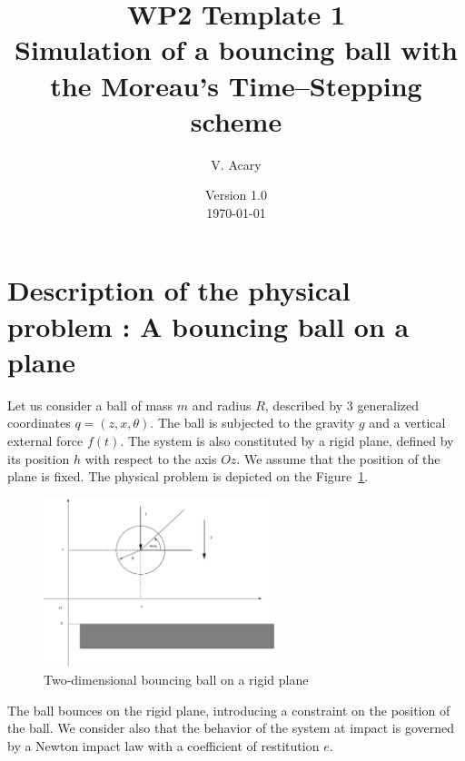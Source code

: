\documentclass[10pt]{article}
\begin{document}
\thispagestyle{empty}
\title{WP2 Template 1 \\
 Simulation of a bouncing ball with \\ the Moreau's Time--Stepping scheme}
\author{V. Acary}

\date{Version 1.0 \\
 \today}
\maketitle


\pagestyle{fancy}

\section{Description of the physical problem : A bouncing ball on a plane}
\label{Sec:description}


Let us consider  a ball of  mass $m$ and radius $R$, described by $3$ generalized coordinates $q=(z,x,\theta)$. The ball is subjected to the gravity $g$ and a vertical external force $f(t)$. The system is also constituted by a rigid plane, defined by its position $h$ with respect to the axis $Oz$. We assume that the position of the plane is fixed. The physical problem  is depicted on the Figure~\ref{Fig:2D-BouncingBall}. 




\begin{figure}[htbp]
  \centering
\includegraphics[width=0.6\textwidth]{./2D-BouncingBall.eps}
  \caption{Two-dimensional bouncing ball on a rigid plane}
  \label{Fig:2D-BouncingBall}
\end{figure}

The ball bounces on the rigid plane, introducing a constraint on the position of the ball. We consider also that the behavior of the system at impact is governed by a Newton impact law with a coefficient of restitution $e$.
\end{document}
